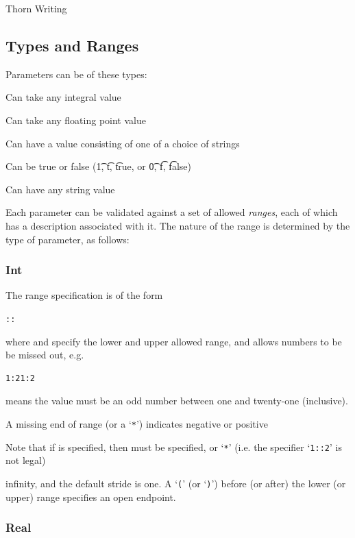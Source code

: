 \begin{cactuspart}{Thorn Writing}
\subsection{Types and Ranges}
\label{sec:Parameters.Types_and_Ranges}

Parameters can be of these types:

\begin{Lentry}
\item[Int]  Can take any integral value
\item[Real] Can take any floating point value
\item[Keyword] Can have a value consisting of one of a choice of strings
\item[Boolean] Can be true or false ({\t 1}, {\t t}, {\t true}, or
{\t 0}, {\t f}, {\t false})
\item[String] Can have any string value
\end{Lentry}

Each parameter can be validated against a set of allowed
\textit{ranges}, each of which has a description associated with it.
The nature
of the range is determined by the type of parameter, as follows:

\subsubsection{Int}

The range specification is of the form

\begin{alltt}
::
\end{alltt}

where  and  specify the lower and upper allowed
range, and  allows numbers to be be missed out, e.g.\
\begin{verbatim}
1:21:2
\end{verbatim}
means the value must be an odd number between one and twenty-one
(inclusive).

A missing end of range (or a `\texttt{*}') indicates negative or positive

Note that if  is specified, then  must be specified, or `\texttt{*}' (i.e.
the specifier `\texttt{1::2}' is not legal)

infinity, and the default stride is one.
A `\texttt{(}' (or `\texttt{)}') before (or after) the lower (or upper) range specifies an open
endpoint.

\subsubsection{Real}


\end{cactuspart}

